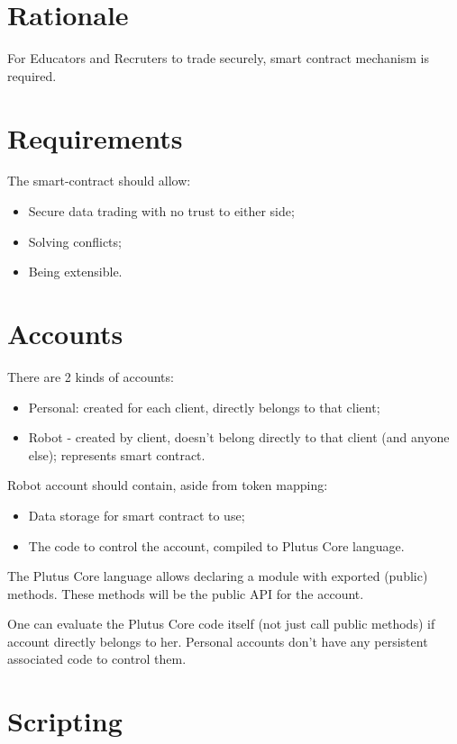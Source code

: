 \documentclass[a4paper]{article}
\date{
  Version 0.1
  \today
}
\begin{document}
\section*{Rationale}

For Educators and Recruters to trade securely, smart contract mechanism is required.

\section*{Requirements}

The smart-contract should allow:
\begin{itemize}
  \item Secure data trading with no trust to either side;
  \item Solving conflicts;
  \item Being extensible.
\end{itemize}

\section*{Accounts}

There are 2 kinds of accounts:
\begin{itemize}
  \item Personal: created for each client, directly belongs to that client;
  \item Robot - created by client, doesn't belong directly to that client (and anyone else); represents smart contract.
\end{itemize}

Robot account should contain, aside from token mapping:
\begin{itemize}
  \item Data storage for smart contract to use;
  \item The code to control the account, compiled to Plutus Core language.
\end{itemize}

The Plutus Core language allows declaring a module with exported (public) methods.
These methods will be the public API for the account.

One can evaluate the Plutus Core code itself (not just call public methods) if account directly belongs to her.
Personal accounts don't have any persistent associated code to control them.

\section*{Scripting}
\end{document}
